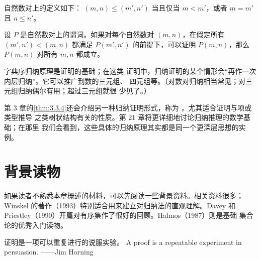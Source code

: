 \begin{definition}
\label{def:2.4.3}
自然数对上的定义如下：
\((m,n)\leq(m',n')\) 当且仅当 \(m<m'\)，或者 \(m=m'\) 且
\(n\leq n'\)。
\end{definition}

\begin{axiom}[字典序归纳原理]
\label{ax:2.4.4}
设 \(P\) 是自然数对上的谓词。如果对每个自然数对 \((m,n)\)，在假定所有
\((m',n')<(m,n)\) 都满足 \(P(m',n')\) 的前提下，可以证明
\(P(m,n)\)，那么 \(P(m,n)\) 对所有 \(m,n\) 都成立。
\end{axiom}

字典序归纳原理是证明的基础；在这类
证明中，归纳证明的某个情形会“再作一次内层归纳”。它可以推广到数的三元组、
四元组等。（对数对归纳相当常见；对三元组归纳偶尔有用；超过三元组就很
少见了。）

第 3 章的\cref{thm:3.3.4}还会介绍另一种归纳证明形式，称为
，尤其适合证明与项或类型推导
之类树状结构有关的性质。第 21 章将更详细地讨论归纳推理的数学基础；在那里
我们会看到，这些具体的归纳原理其实都是同一个更深层思想的实例。

\section{背景读物}
\label{sec:2.5}

如果读者不熟悉本章概述的材料，可以先阅读一些背景资料。相关资料很多；
Winskel 的著作（1993）特别适合用来建立对归纳法的直观理解。Davey 和
Priestley（1990）开篇对有序集作了很好的回顾。Halmos（1987）则是基础
集合论的优秀入门读物。

\bilingualepigraph
  {证明是一项可以重复进行的说服实验。}
  {A proof is a repeatable experiment in persuasion.}
  {——Jim Horning}
